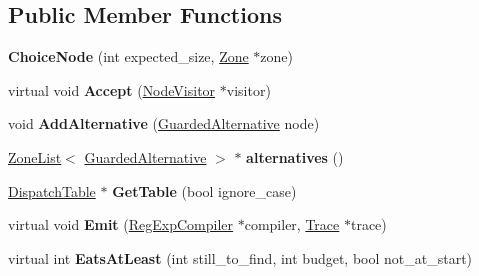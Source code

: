 \subsection*{Public Member Functions}
\begin{DoxyCompactItemize}
\item 
{\bfseries Choice\+Node} (int expected\+\_\+size, \hyperlink{classv8_1_1internal_1_1_zone}{Zone} $\ast$zone)\hypertarget{classv8_1_1internal_1_1_choice_node_a018fa28745789e0eb28b243570ed025c}{}\label{classv8_1_1internal_1_1_choice_node_a018fa28745789e0eb28b243570ed025c}

\item 
virtual void {\bfseries Accept} (\hyperlink{classv8_1_1internal_1_1_node_visitor}{Node\+Visitor} $\ast$visitor)\hypertarget{classv8_1_1internal_1_1_choice_node_a53d7cb491441f0469f69073aab9de65e}{}\label{classv8_1_1internal_1_1_choice_node_a53d7cb491441f0469f69073aab9de65e}

\item 
void {\bfseries Add\+Alternative} (\hyperlink{classv8_1_1internal_1_1_guarded_alternative}{Guarded\+Alternative} node)\hypertarget{classv8_1_1internal_1_1_choice_node_a43dcb33c0c050a62d779d8d7c82ab868}{}\label{classv8_1_1internal_1_1_choice_node_a43dcb33c0c050a62d779d8d7c82ab868}

\item 
\hyperlink{classv8_1_1internal_1_1_zone_list}{Zone\+List}$<$ \hyperlink{classv8_1_1internal_1_1_guarded_alternative}{Guarded\+Alternative} $>$ $\ast$ {\bfseries alternatives} ()\hypertarget{classv8_1_1internal_1_1_choice_node_a2e4d4b33b955dfbef9722332f9209906}{}\label{classv8_1_1internal_1_1_choice_node_a2e4d4b33b955dfbef9722332f9209906}

\item 
\hyperlink{classv8_1_1internal_1_1_dispatch_table}{Dispatch\+Table} $\ast$ {\bfseries Get\+Table} (bool ignore\+\_\+case)\hypertarget{classv8_1_1internal_1_1_choice_node_a0e140854cd34988a22154bca49ead44c}{}\label{classv8_1_1internal_1_1_choice_node_a0e140854cd34988a22154bca49ead44c}

\item 
virtual void {\bfseries Emit} (\hyperlink{classv8_1_1internal_1_1_reg_exp_compiler}{Reg\+Exp\+Compiler} $\ast$compiler, \hyperlink{classv8_1_1internal_1_1_trace}{Trace} $\ast$trace)\hypertarget{classv8_1_1internal_1_1_choice_node_afdb66d254862379b9ee921a0bf85077d}{}\label{classv8_1_1internal_1_1_choice_node_afdb66d254862379b9ee921a0bf85077d}

\item 
virtual int {\bfseries Eats\+At\+Least} (int still\+\_\+to\+\_\+find, int budget, bool not\+\_\+at\+\_\+start)\hypertarget{classv8_1_1internal_1_1_choice_node_ab757cf462efb1b94601ee36bae019536}{}\label{classv8_1_1internal_1_1_choice_node_ab757cf462efb1b94601ee36bae019536}


\end{DoxyCompactItemize}
